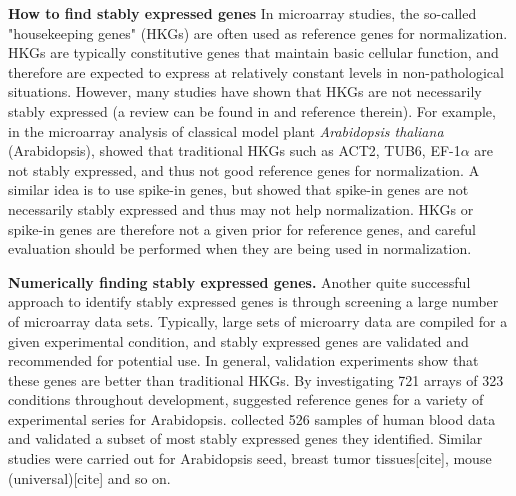 \documentclass[11pt, a4paper]{article}
\begin{document}
\textbf{How to find stably expressed genes}
In microarray studies, the so-called "housekeeping genes" (HKGs) are often
used as reference genes for normalization. HKGs are typically constitutive
genes that maintain basic cellular function, and therefore are expected to
express at relatively constant levels in non-pathological situations.
However, many studies have shown that HKGs are not necessarily stably
expressed (a review can be found in \cite{huggett2005real} and reference therein). 
For example, in the microarray analysis of classical model plant
\textit{Arabidopsis thaliana} (Arabidopsis), \cite{czechowski2005genome}
showed that traditional HKGs such as ACT2, TUB6, EF-1$\alpha$ are not
stably expressed, and thus not good reference genes for normalization.  
A similar idea is to use spike-in genes, but \cite{risso2014nat} showed that spike-in genes are not necessarily stably
expressed and thus may not help normalization. HKGs or spike-in genes are therefore not a given prior for reference genes, and careful evaluation should be performed when they are being used in normalization.


\textbf{Numerically finding stably expressed genes.}
Another quite successful approach to identify stably expressed genes is through screening a large number of microarray data sets. Typically, large sets of microarry data are compiled for a given experimental condition, and stably expressed genes are validated and recommended for potential use.  In general, validation experiments show that these genes are better than traditional HKGs. By investigating 721 arrays of 323 conditions throughout development, \cite{czechowski2005genome} suggested reference genes for a variety of experimental series for Arabidopsis. \cite{stamova2009identification} collected 526 samples of human blood  data and validated a subset of most stably expressed genes they identified. Similar studies were carried out for Arabidopsis seed\citep{dekkers2012identification}, breast tumor tissues[cite], mouse (universal)[cite] and so on. 
\end{document}
